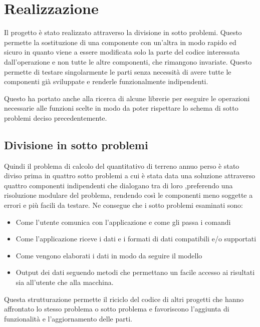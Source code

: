 
\chapter{Realizzazione}
\label{cap:realizzazione}

Il progetto è stato realizzato attraverso la divisione in sotto problemi. Questo permette la sostituzione di una componente con un'altra in modo rapido ed sicuro in quanto viene a essere modificata solo la parte del codice interessata dall'operazione e non tutte le altre componenti, che rimangono invariate. Questo permette di testare singolarmente le parti senza necessità di avere tutte le componenti già sviluppate e renderle funzionalmente indipendenti.

Questo ha portato anche alla ricerca di alcune librerie per eseguire le operazioni necessarie alle funzioni scelte in modo da poter rispettare lo schema di sotto problemi deciso precedentemente.

\section{Divisione in sotto problemi}
Quindi il problema di calcolo del quantitativo di terreno annuo perso è stato diviso prima in quattro sotto problemi a cui è stata data una soluzione attraverso quattro componenti indipendenti che dialogano tra di loro ,preferendo una risoluzione modulare del problema, rendendo così le componenti meno soggette a errori e più facili da testare.
Ne consegue che i sotto problemi esaminati sono:
\begin{itemize}
\item Come l'utente comunica con l'applicazione e come gli passa i comandi
\item Come l'applicazione riceve i dati e i formati di dati compatibili e/o supportati
\item Come vengono elaborati i dati in modo da seguire il modello \rusle
\item Output dei dati seguendo metodi che permettano un facile accesso ai risultati sia all'utente che alla macchina.
\end{itemize}

Questa strutturazione permette il riciclo del codice di altri progetti che hanno affrontato lo stesso problema o sotto problema e favoriscono l'aggiunta di funzionalità e l'aggiornamento delle parti.

